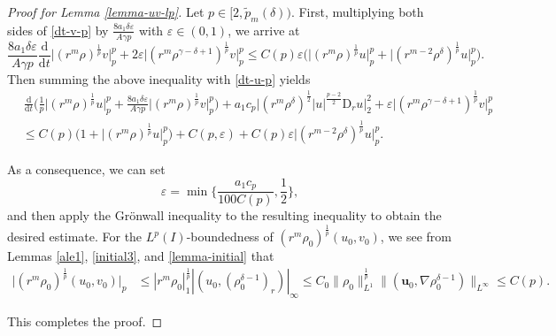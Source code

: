 \documentclass[11pt,reqno]{amsart}
\numberwithin{rk}{section}
\numberwithin{prop}{section}
\numberwithin{mydef}{section}
\numberwithin{lem}{section}
\numberwithin{equation}{section}
\numberwithin{thm}{section}
\begin{document}
\begin{proof}[Proof for Lemma \ref{lemma-uv-lp}]
Let $p\in [2,\tilde{p}_{m}(\delta))$. First, multiplying both sides of \eqref{dt-v-p} by $\frac{8a_1\delta\varepsilon}{A\gamma p}$ 
with $\varepsilon\in (0,1)$, we arrive at
\begin{equation*} 
\frac{8a_1\delta\varepsilon}{A\gamma p}\frac{\mathrm{d}}{\mathrm{d}t}\big|(r^m\rho)^\frac{1}{p} v\big|_{p}^{p}+2\varepsilon\big|(r^m\rho^{\gamma-\delta+1})^\frac{1}{p} v\big|_{p}^{p}\leq C(p)\varepsilon\big(\big|(r^m\rho)^\frac{1}{p} u\big|_{p}^{p}+\big|(r^{m-2}\rho^\delta)^\frac{1}{p} u\big|_{p}^{p}\big).
\end{equation*}
Then summing the above inequality with \eqref{dt-u-p} yields 
\begin{equation*}
\begin{aligned}
&\,\frac{\mathrm{d}}{\mathrm{d}t}\Big(\frac{1}{p}\big|(r^m\rho)^{\frac{1}{p}} u\big|_{p}^{p}+\frac{8a_1\delta\varepsilon}{A\gamma p} \big|(r^m\rho)^\frac{1}{p} v\big|_{p}^{p}\Big) + a_1 c_p \big|(r^m\rho^\delta)^{\frac{1}{2}}|u|^{\frac{p-2}{2}}\mathrm{D}_r u\big|_2^2 +\varepsilon\big|(r^m\rho^{\gamma-\delta+1})^\frac{1}{p} v\big|_{p}^{p}\\
&\leq C(p)\big(1+\big|(r^m\rho)^\frac{1}{p}u\big|_{p}^{p}\big)+ C(p,\varepsilon)+C(p)\varepsilon\big|(r^{m-2}\rho^\delta)^\frac{1}{p} u\big|_{p}^{p}.
\end{aligned}
\end{equation*}

As a consequence, we can set
\begin{equation*}
\varepsilon=\min\big\{\frac{a_1 c_p}{100C(p)},\frac{1}{2}\big\},
\end{equation*}
and then apply the Gr\"onwall inequality to the resulting inequality to obtain
the desired estimate. For the $L^{p}(I)$-boundedness of $(r^m\rho_0)^{\frac{1}{p}}(u_0,v_0)$, we see from Lemmas \ref{ale1}, \ref{initial3}, and \ref{lemma-initial} that
\begin{align*}
\big|(r^m\rho_0)^\frac{1}{p}(u_0,v_0)\big|_p&\leq |r^m\rho_0|_1^\frac{1}{p}|(u_0,(\rho_0^{\delta-1})_r)|_{\infty}\leq C_0\|\rho_0\|_{L^1}^\frac{1}{p}\|(\boldsymbol{u}_0,\nabla \rho_0^{\delta-1})\|_{L^\infty} \leq C(p).
\end{align*}

This completes the proof.
\end{proof}
\end{document}
